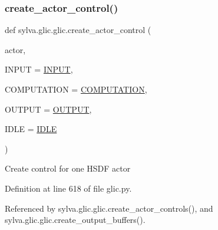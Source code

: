 \subsubsection{\texorpdfstring{create\+\_\+actor\+\_\+control()}{create\_actor\_control()}}
{\footnotesize\ttfamily def sylva.\+glic.\+glic.\+create\+\_\+actor\+\_\+control (\begin{DoxyParamCaption}\item[{}]{actor,  }\item[{}]{I\+N\+P\+UT = {\ttfamily \hyperlink{namespacesylva_1_1glic_1_1glic_ab7e66a35c60e9c2fbeb69191240a7dc9}{I\+N\+P\+UT}},  }\item[{}]{C\+O\+M\+P\+U\+T\+A\+T\+I\+ON = {\ttfamily \hyperlink{namespacesylva_1_1glic_1_1glic_a7ed9d88425bdb7584d63853dc31381f2}{C\+O\+M\+P\+U\+T\+A\+T\+I\+ON}},  }\item[{}]{O\+U\+T\+P\+UT = {\ttfamily \hyperlink{namespacesylva_1_1glic_1_1glic_ad6e11d2ff626d576dddd38f99952a31a}{O\+U\+T\+P\+UT}},  }\item[{}]{I\+D\+LE = {\ttfamily \hyperlink{namespacesylva_1_1glic_1_1glic_ada3197b7ecf6f2b781f0f358b482a2b4}{I\+D\+LE}} }\end{DoxyParamCaption})}

\begin{DoxyVerb}Create control for one HSDF actor \end{DoxyVerb}
 

Definition at line 618 of file glic.\+py.



Referenced by sylva.\+glic.\+glic.\+create\+\_\+actor\+\_\+controls(), and sylva.\+glic.\+glic.\+create\+\_\+output\+\_\+buffers().


